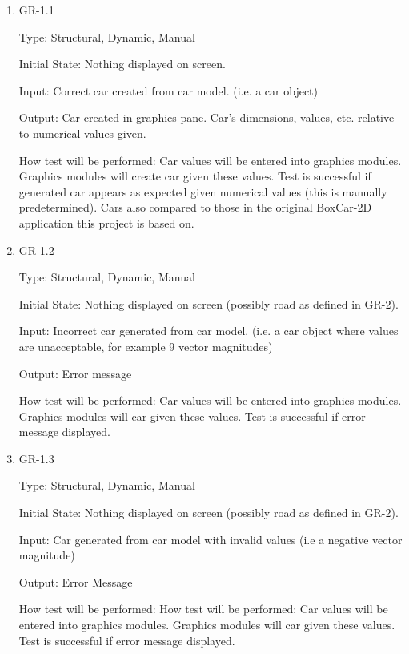 \documentclass[12pt, titlepage]{article}
\begin{document}
\begin{enumerate}

\item{GR-1.1\\}

Type: Structural, Dynamic, Manual
					
Initial State: Nothing displayed on screen.
					
Input: Correct car created from car model. (i.e. a car object)
					
Output: Car created in graphics pane. Car's dimensions, values, etc. relative to 
numerical values given.
					
How test will be performed: Car values will be entered into graphics modules. 
Graphics modules will create car given these values. Test is successful if 
generated 
car appears as expected given numerical values (this is manually predetermined). 
Cars also compared to those in the original BoxCar-2D application this project 
is based on.

\item{GR-1.2\\}

Type: Structural, Dynamic, Manual
					
Initial State: Nothing displayed on screen (possibly road as defined in GR-2).
					
Input: Incorrect car generated from car model. (i.e. a car object where values 
are unacceptable, for example 9 vector magnitudes)
					
Output: Error message
					
How test will be performed: Car values will be entered into graphics modules. 
Graphics modules will car given these values. Test is successful if error 
message displayed.

\item{GR-1.3\\}

Type: Structural, Dynamic, Manual
					
Initial State: Nothing displayed on screen (possibly road as defined in GR-2).
					
Input: Car generated from car model with invalid values (i.e a negative vector 
magnitude)
					
Output: Error Message
					
How test will be performed: How test will be performed: Car values will be 
entered into graphics modules. Graphics modules will car given these values. 
Test is successful if error message displayed.
					

\end{enumerate}
\end{document}
